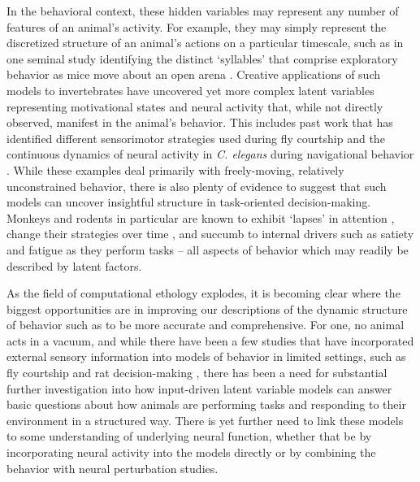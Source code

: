 In the behavioral context, these hidden variables may represent any number of features of an animal's activity. For example, they may simply represent the discretized structure of an animal's actions on a particular timescale, such as in one seminal study identifying the distinct `syllables' that comprise exploratory behavior as mice move about an open arena \cite{wiltschko_mapping_2015}. Creative applications of such models to invertebrates have uncovered yet more complex latent variables representing motivational states and neural activity that, while not directly observed, manifest in the animal's behavior. This includes past work that has identified different sensorimotor strategies used during fly courtship \cite{calhoun_unsupervised_2019} and the continuous dynamics of neural activity in \textit{C. elegans} during navigational behavior \cite{linderman_hierarchical_2019}. While these examples deal primarily with freely-moving, relatively unconstrained behavior, there is also plenty of evidence to suggest that such models can uncover insightful structure in task-oriented decision-making. Monkeys and rodents in particular are known to exhibit `lapses' in attention \cite{pisupati_lapses_2021}, change their strategies over time \cite{roy_extracting_2021}, and succumb to internal drivers such as satiety and fatigue \cite{carandini_probing_2013} as they perform tasks -- all aspects of behavior which may readily be described by latent factors. 

As the field of computational ethology explodes, it is becoming clear where the biggest opportunities are in improving our descriptions of the dynamic structure of behavior such as to be more accurate and comprehensive. For one, no animal acts in a vacuum, and while there have been a few studies that have incorporated external sensory information into models of behavior in limited settings, such as fly courtship \cite{calhoun_unsupervised_2019} and rat decision-making \cite{roy_extracting_2021}, there has been a need for substantial further investigation into how input-driven latent variable models can answer basic questions about how animals are performing tasks and responding to their environment in a structured way. There is yet further need to link these models to some understanding of underlying neural function, whether that be by incorporating neural activity into the models directly or by combining the behavior with neural perturbation studies.  

